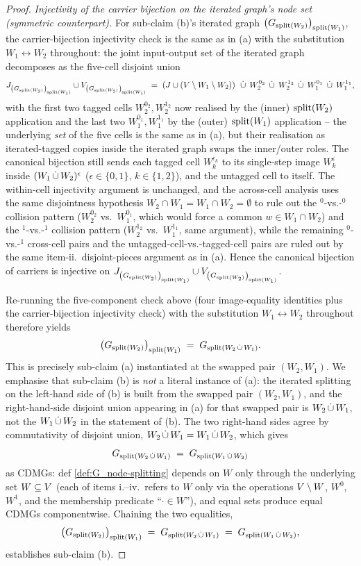 \documentclass[main]{subfiles}
\begin{document}
\begin{proof}
\medskip\noindent\emph{Injectivity of the carrier bijection on the iterated graph's node set (symmetric counterpart).}
For sub-claim (b)'s iterated graph $\left ( G_{\mathrm{split}(W_2)} \right )_{\mathrm{split}(W_1)}$, the carrier-bijection injectivity check is the same as in (a) with the substitution $W_1 \leftrightarrow W_2$ throughout: the joint input-output set of the iterated graph decomposes as the five-cell disjoint union
\[
    J_{\left ( G_{\mathrm{split}(W_2)} \right )_{\mathrm{split}(W_1)}} \cup V_{\left ( G_{\mathrm{split}(W_2)} \right )_{\mathrm{split}(W_1)}}
    \;=\; \left ( J \cup (V \setminus W_1 \setminus W_2) \right ) \;\,\dot{\cup}\,\; W_2^{0_2} \;\,\dot{\cup}\,\; W_2^{1_2} \;\,\dot{\cup}\,\; W_1^{0_1} \;\,\dot{\cup}\,\; W_1^{1_1},
\]
with the first two tagged cells $W_2^{0_2}, W_2^{1_2}$ now realised by the (inner) $\mathrm{split}(W_2)$ application and the last two $W_1^{0_1}, W_1^{1_1}$ by the (outer) $\mathrm{split}(W_1)$ application -- the underlying \emph{set} of the five cells is the same as in (a), but their realisation as iterated-tagged copies inside the iterated graph swaps the inner/outer roles. The canonical bijection still sends each tagged cell $W_k^{\epsilon_k}$ to its single-step image $W_k^{\epsilon}$ inside $(W_1 \,\dot{\cup}\, W_2)^{\epsilon}$ ($\epsilon \in \{0, 1\}$, $k \in \{1, 2\}$), and the untagged cell to itself. The within-cell injectivity argument is unchanged, and the across-cell analysis uses the same disjointness hypothesis $W_2 \cap W_1 = W_1 \cap W_2 = \emptyset$ to rule out the $^0$-vs.-$^0$ collision pattern ($W_2^{0_2}$ vs.\ $W_1^{0_1}$, which would force a common $w \in W_1 \cap W_2$) and the $^1$-vs.-$^1$ collision pattern ($W_2^{1_2}$ vs.\ $W_1^{1_1}$, same argument), while the remaining $^0$-vs.-$^1$ cross-cell pairs and the untagged-cell-vs.-tagged-cell pairs are ruled out by the same item-ii.\ disjoint-pieces argument as in (a). Hence the canonical bijection of carriers is injective on $J_{\left ( G_{\mathrm{split}(W_2)} \right )_{\mathrm{split}(W_1)}} \cup V_{\left ( G_{\mathrm{split}(W_2)} \right )_{\mathrm{split}(W_1)}}$. \checkmark

\medskip
Re-running the five-component check above (four image-equality identities plus the carrier-bijection injectivity check) with the substitution $W_1 \leftrightarrow W_2$ throughout therefore yields
\[
    \left ( G_{\mathrm{split}(W_2)} \right )_{\mathrm{split}(W_1)} \;=\; G_{\mathrm{split}(W_2 \,\dot{\cup}\, W_1)}.
\]
This is precisely sub-claim (a) instantiated at the swapped pair $(W_2, W_1)$. We emphasise that sub-claim (b) is \emph{not} a literal instance of (a): the iterated splitting on the left-hand side of (b) is built from the swapped pair $(W_2, W_1)$, and the right-hand-side disjoint union appearing in (a) for that swapped pair is $W_2 \,\dot{\cup}\, W_1$, not the $W_1 \,\dot{\cup}\, W_2$ in the statement of (b). The two right-hand sides agree by commutativity of disjoint union, $W_2 \,\dot{\cup}\, W_1 = W_1 \,\dot{\cup}\, W_2$, which gives
\[
    G_{\mathrm{split}(W_2 \,\dot{\cup}\, W_1)} \;=\; G_{\mathrm{split}(W_1 \,\dot{\cup}\, W_2)}
\]
as CDMGs: def \ref{def:G_node-splitting} depends on $W$ only through the underlying set $W \subseteq V$ (each of items i.--iv.\ refers to $W$ only via the operations $V \setminus W$, $W^0$, $W^1$, and the membership predicate ``$\cdot \in W$''), and equal sets produce equal CDMGs componentwise. Chaining the two equalities,
\[
    \left ( G_{\mathrm{split}(W_2)} \right )_{\mathrm{split}(W_1)} \;=\; G_{\mathrm{split}(W_2 \,\dot{\cup}\, W_1)} \;=\; G_{\mathrm{split}(W_1 \,\dot{\cup}\, W_2)},
\]
establishes sub-claim (b).


\end{proof}
\end{document}
